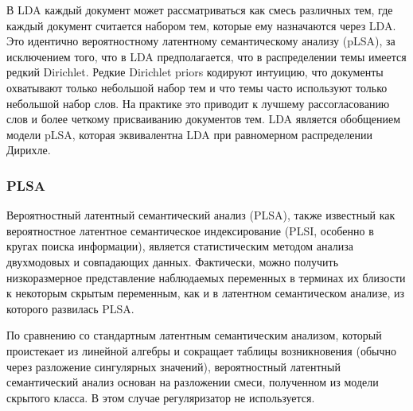 \documentclass{article}
\begin{document}
В LDA каждый документ может рассматриваться как смесь различных тем, где каждый документ считается набором тем, которые ему назначаются через LDA. Это идентично вероятностному латентному семантическому анализу (pLSA), за исключением того, что в LDA предполагается, что в распределении темы имеется редкий Dirichlet. Редкие Dirichlet priors кодируют интуицию, что документы охватывают только небольшой набор тем и что темы часто используют только небольшой набор слов. На практике это приводит к лучшему рассогласованию слов и более четкому присваиванию документов тем. LDA является обобщением модели pLSA, которая эквивалентна LDA при равномерном распределении Дирихле.

\subsubsection{PLSA}
Вероятностный латентный семантический анализ (PLSA), также известный как вероятностное латентное семантическое индексирование (PLSI, особенно в кругах поиска информации), является статистическим методом анализа двухмодовых и совпадающих данных. Фактически, можно получить низкоразмерное представление наблюдаемых переменных в терминах их близости к некоторым скрытым переменным, как и в латентном семантическом анализе, из которого развилась PLSA.

По сравнению со стандартным латентным семантическим анализом, который проистекает из линейной алгебры и сокращает таблицы возникновения (обычно через разложение сингулярных значений), вероятностный латентный семантический анализ основан на разложении смеси, полученном из модели скрытого класса.
В этом случае регуляризатор не используется.
\maketitle


\end{document}
